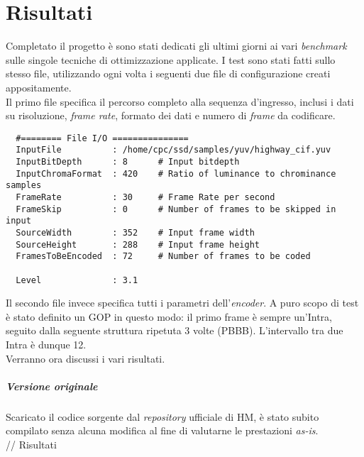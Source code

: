 
\chapter{Risultati} %

\label{Chapter7} %


Completato il progetto è sono stati dedicati gli ultimi giorni ai vari 
\emph{benchmark} sulle singole tecniche di ottimizzazione applicate. 
I test sono stati fatti sullo stesso file, utilizzando ogni volta i seguenti 
due file di configurazione creati appositamente.\\

Il primo file specifica il percorso completo alla sequenza d'ingresso, inclusi 
i dati su risoluzione, \emph{frame rate}, formato dei dati e numero di 
\emph{frame} da codificare.
\begin{lstlisting}
  #======== File I/O ===============
  InputFile          : /home/cpc/ssd/samples/yuv/highway_cif.yuv
  InputBitDepth      : 8      # Input bitdepth
  InputChromaFormat  : 420    # Ratio of luminance to chrominance samples
  FrameRate          : 30     # Frame Rate per second
  FrameSkip          : 0      # Number of frames to be skipped in input
  SourceWidth        : 352    # Input frame width
  SourceHeight       : 288    # Input frame height
  FramesToBeEncoded  : 72     # Number of frames to be coded
  
  Level              : 3.1
\end{lstlisting}

Il secondo file invece specifica tutti i parametri dell'\emph{encoder}. A puro 
scopo di test è stato definito un GOP in questo modo: il primo frame è sempre 
un'Intra, seguito dalla seguente struttura ripetuta 3 volte (PBBB). 
L'intervallo tra due Intra è dunque 12. \\

Verranno ora discussi i vari risultati.

\paragraph{Versione originale \\}
  Scaricato il codice sorgente dal \emph{repository} ufficiale di HM, è stato 
  subito compilato senza alcuna modifica al fine di valutarne le prestazioni 
  \emph{as-is}. \\
  // Risultati

